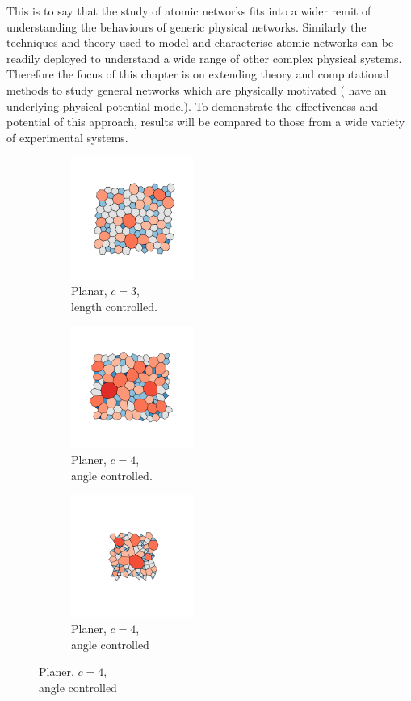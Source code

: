 This is to say that the study of atomic networks fits into a wider remit of understanding the behaviours of generic physical networks.
Similarly the techniques and theory used to model and characterise atomic networks can be readily deployed to understand a wide range of other complex physical systems.
Therefore the focus of this chapter is on extending theory and computational methods to study general \td{} networks which are physically motivated (\ie{} have an underlying physical potential model). 
To demonstrate the effectiveness and potential of this approach, results will be compared to those from a wide variety of experimental systems.

\begin{figure}[bt]
     \centering
     
      \begin{subfigure}[b]{0.25\textwidth}
         \centering
         \includegraphics[height=4cm]{./figures/general_networks/silica.pdf}
         \caption{Planar, $c=3$, \\ length controlled.}
         \label{fig:ne1}
     \end{subfigure}
     \hfill
     \begin{subfigure}[b]{0.25\textwidth}
         \centering
         \includegraphics[height=4cm]{./figures/general_networks/foam.pdf}
         \caption{Planer, $c=4$, \\ angle controlled.}
         \label{fig:ne2}
     \end{subfigure}
     \hfill
     \begin{subfigure}[b]{0.25\textwidth}
         \centering
         \includegraphics[height=4cm]{./figures/general_networks/four.pdf}
         \caption{Planer, $c=4$, \\ angle controlled}
         \label{fig:ne3}
     \end{subfigure}
     \hfill
     

\end{figure}
